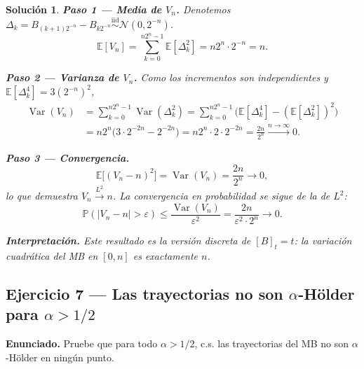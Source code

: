 \documentclass[12pt,letterpaper]{article}
\theoremstyle{ejercicio}
\theoremstyle{solucion}
\newtheorem*{solucion}{Solución}
\newcommand{\E}{\mathbb{E}}
\newcommand{\Var}{\operatorname{Var}}
\newcommand{\iid}{\overset{\text{iid}}{\sim}}
\renewcommand{\P}{\mathbb{P}}
\begin{document}
\begin{solucion}

\textbf{Paso 1 — Media de $V_n$.}
Denotemos $\Delta_k = B_{(k+1)2^{-n}}-B_{k2^{-n}}\iid\mathcal{N}(0,2^{-n})$.
\[
  \E[V_n] = \sum_{k=0}^{n2^n-1}\E[\Delta_k^2]
           = n2^n\cdot 2^{-n} = n.
\]

\textbf{Paso 2 — Varianza de $V_n$.}
Como los incrementos son independientes y $\E[\Delta_k^4]=3(2^{-n})^2$,
\begin{align*}
  \Var(V_n)
  &= \sum_{k=0}^{n2^n-1}\Var(\Delta_k^2)
   = \sum_{k=0}^{n2^n-1}\bigl(\E[\Delta_k^4]-(\E[\Delta_k^2])^2\bigr)\\
  &= n2^n\bigl(3\cdot 2^{-2n} - 2^{-2n}\bigr)
   = n2^n\cdot 2\cdot 2^{-2n}
   = \frac{2n}{2^n} \xrightarrow{n\to\infty} 0.
\end{align*}

\textbf{Paso 3 — Convergencia.}
\[
  \E\bigl[(V_n-n)^2\bigr] = \Var(V_n) = \frac{2n}{2^n}\to 0,
\]
lo que demuestra $V_n\xrightarrow{L^2} n$.
La convergencia en probabilidad se sigue de la de $L^2$:
\[
  \P\!\left(|V_n-n|>\varepsilon\right)\le\frac{\Var(V_n)}{\varepsilon^2}
  = \frac{2n}{\varepsilon^2\cdot 2^n}\to 0.
\]

\textbf{Interpretación.} Este resultado es la versión discreta de $[B]_t=t$: la variación
cuadrática del MB en $[0,n]$ es exactamente $n$.
\end{solucion}

\subsection*{Ejercicio 7 — Las trayectorias no son $\alpha$-Hölder para $\alpha>1/2$}

\begin{recuadro}
\textbf{Enunciado.} Pruebe que para todo $\alpha>1/2$, c.s. las trayectorias del MB
no son $\alpha$-Hölder en ningún punto.
\end{recuadro}
\end{document}
